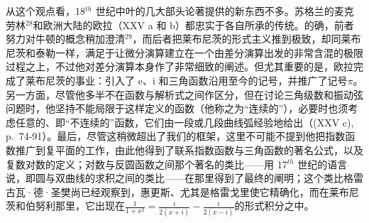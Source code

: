 从这个观点看，18\(^{th}\) 世纪中叶的几大部头论著提供的新东西不多。苏格兰的麦克劳林\(^{28}\)和欧洲大陆的欧拉（XXV a 和 b）都忠实于各自所承的传统。的确，前者努力对牛顿的概念稍加澄清\(^{29}\)，而后者把莱布尼茨的形式主义推到极致，却同莱布尼茨和泰勒一样，满足于让微分演算建立在一个由差分演算出发的非常含混的极限过程之上，不过他对差分演算本身作了非常细致的阐述。但尤其重要的是，欧拉完成了莱布尼茨的事业：引入了 e、i 和三角函数沿用至今的记号，并推广了记号\(\pi\)。另一方面，尽管他多半不在函数与解析式之间作区分，但在讨论三角级数和振动弦问题时，他坚持不能局限于这样定义的函数（他称之为“连续的”），必要时也须考虑任意的、即“不连续的”函数，它们由一段或几段曲线弧经验地给出（(XXV c), p.~74-91）。最后，尽管这稍微超出了我们的框架，这里不可能不提到他把指数函数推广到复平面的工作，由此他得到了联系指数函数与三角函数的著名公式，以及复数对数的定义；对数与反圆函数之间那个著名的类比——用 17\(^{th}\) 世纪的语言说，即圆与双曲线的求积之间的类比——在那里得到了最终的阐明；这个类比格雷古瓦·德·圣樊尚已经观察到，惠更斯、尤其是格雷戈里使它精确化，而在莱布尼茨和伯努利那里，它出现在\(\frac{1}{1 + x^{2}} = \frac{i}{2(x + i)} - \frac{i}{2(x - i)}\)的形式积分之中。
